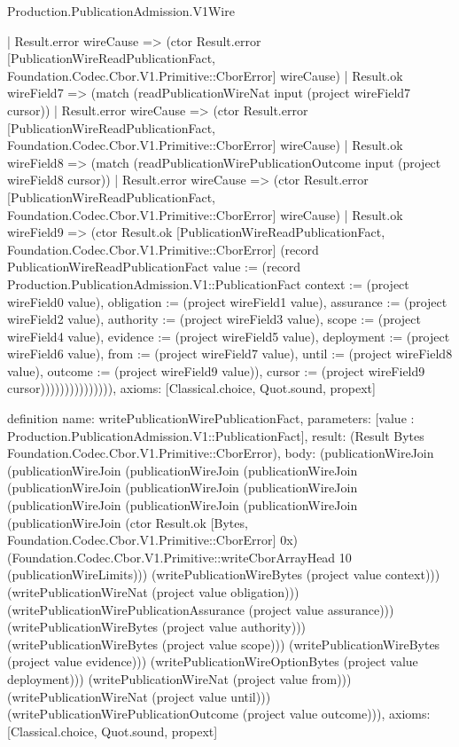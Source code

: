 \begin{lexlean}{Production.PublicationAdmission.V1Wire}
\begin{semanticmodule}
{                      | Result.error wireCause => (ctor Result.error [PublicationWireReadPublicationFact, Foundation.Codec.Cbor.V1.Primitive::CborError] wireCause)
                      | Result.ok wireField7 => (match (readPublicationWireNat input (project wireField7 cursor))
                        | Result.error wireCause => (ctor Result.error [PublicationWireReadPublicationFact, Foundation.Codec.Cbor.V1.Primitive::CborError] wireCause)
                        | Result.ok wireField8 => (match (readPublicationWirePublicationOutcome input (project wireField8 cursor))
                          | Result.error wireCause => (ctor Result.error [PublicationWireReadPublicationFact, Foundation.Codec.Cbor.V1.Primitive::CborError] wireCause)
                          | Result.ok wireField9 => (ctor Result.ok [PublicationWireReadPublicationFact, Foundation.Codec.Cbor.V1.Primitive::CborError] (record PublicationWireReadPublicationFact {value := (record Production.PublicationAdmission.V1::PublicationFact {context := (project wireField0 value), obligation := (project wireField1 value), assurance := (project wireField2 value), authority := (project wireField3 value), scope := (project wireField4 value), evidence := (project wireField5 value), deployment := (project wireField6 value), from := (project wireField7 value), until := (project wireField8 value), outcome := (project wireField9 value)}), cursor := (project wireField9 cursor)})))))))))))))),
  axioms: [Classical.choice, Quot.sound, propext]
}

definition{
  name: writePublicationWirePublicationFact,
  parameters: [value : Production.PublicationAdmission.V1::PublicationFact],
  result: (Result Bytes Foundation.Codec.Cbor.V1.Primitive::CborError),
  body: (publicationWireJoin (publicationWireJoin (publicationWireJoin (publicationWireJoin (publicationWireJoin (publicationWireJoin (publicationWireJoin (publicationWireJoin (publicationWireJoin (publicationWireJoin (publicationWireJoin (ctor Result.ok [Bytes, Foundation.Codec.Cbor.V1.Primitive::CborError] 0x) (Foundation.Codec.Cbor.V1.Primitive::writeCborArrayHead 10 (publicationWireLimits))) (writePublicationWireBytes (project value context))) (writePublicationWireNat (project value obligation))) (writePublicationWirePublicationAssurance (project value assurance))) (writePublicationWireBytes (project value authority))) (writePublicationWireBytes (project value scope))) (writePublicationWireBytes (project value evidence))) (writePublicationWireOptionBytes (project value deployment))) (writePublicationWireNat (project value from))) (writePublicationWireNat (project value until))) (writePublicationWirePublicationOutcome (project value outcome))),
  axioms: [Classical.choice, Quot.sound, propext]
}


\end{semanticmodule}
\end{lexlean}
